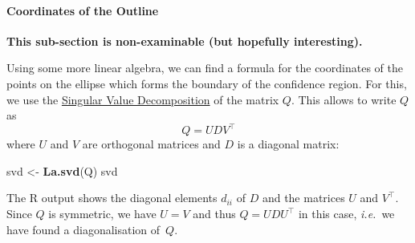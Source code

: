 \documentclass[
  a4paper,
]{article}
\newenvironment{Shaded}{\begin{snugshade}}{\end{snugshade}}
\newcommand{\FunctionTok}[1]{\textcolor[rgb]{0.13,0.29,0.53}{\textbf{#1}}}
\newcommand{\NormalTok}[1]{#1}
\newcommand{\OtherTok}[1]{\textcolor[rgb]{0.56,0.35,0.01}{#1}}
\theoremstyle{definition}
\theoremstyle{definition}
\theoremstyle{definition}
\theoremstyle{definition}
\theoremstyle{remark}
\begin{document}
\paragraph{Coordinates of the Outline}\label{coordinates-of-the-outline}

\textbf{This sub-section is non-examinable (but hopefully interesting).}

Using some more linear algebra, we can find a formula for the coordinates
of the points on the ellipse which forms the boundary of the confidence
region. For this, we use the
\href{https://en.wikipedia.org/wiki/Singular_value_decomposition}{Singular Value Decomposition}
of the matrix \(Q\). This allows to write \(Q\) as
\begin{equation*}
  Q = U D V^\top
\end{equation*}
where \(U\) and \(V\) are orthogonal matrices and \(D\) is a diagonal matrix:

\begin{Shaded}
\begin{Highlighting}[]
\NormalTok{svd }\OtherTok{\textless{}{-}} \FunctionTok{La.svd}\NormalTok{(Q)}
\NormalTok{svd}
\end{Highlighting}
\end{Shaded}

\begin{Shaded}
\end{Shaded}

The R output shows the diagonal elements \(d_{ii}\) of \(D\) and the matrices \(U\)
and \(V^\top\). Since \(Q\) is symmetric, we have \(U = V\) and thus \(Q = U D U^\top\)
in this case, \emph{i.e.}~we have found a diagonalisation of~\(Q\).
\end{document}
